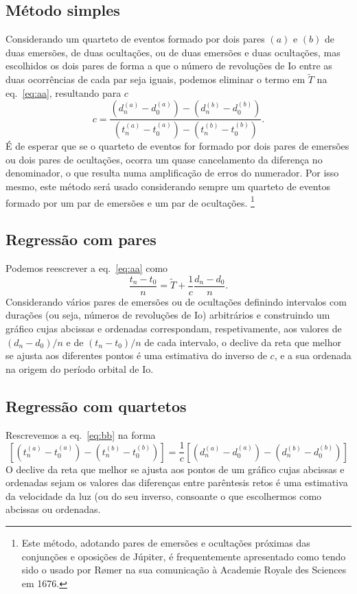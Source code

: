 \documentclass[]{article}
\begin{document}
\subsection{Método simples}
Considerando um quarteto de eventos formado por dois pares $(a)$ e $(b)$ de duas
emersões, de duas oculta\-ções, ou de duas emersões e duas ocultações, mas
escolhidos os dois pares de forma a que o número de revoluções de Io entre as
duas ocorrências de cada par seja iguais, podemos eliminar o termo em $\tilde T$
na eq.~\eqref{eq:aa}, resultando para $c$
\begin{equation}\label{eq:bb}
  c=\frac%
  {\left(d^{(a)}_n-d^{(a)}_0\right)-\left(d^{(b)}_n-d^{(b)}_0\right)}%
  {\left(t^{(a)}_n-t^{(a)}_0\right)-\left(t^{(b)}_n-t^{(b)}_0\right)}.
\end{equation}
 É de esperar que se o quarteto de eventos for formado por dois pares
de emersões ou dois pares de ocultações, ocorra um quase cancelamento da
diferença no denominador, o que resulta numa amplificação de erros do numerador.
Por isso mesmo, este método será usado considerando sempre um quarteto de
eventos formado por um par de emersões e um par de ocultações.%
\footnote{Este método, adotando pares de emersões e ocultações próximas das
  conjunções e oposições de Júpiter, é frequentemente apresentado como tendo
  sido o usado por R{\o}mer na sua comunicação à Academie Royale des Sciences em
1676.}

\subsection{Regressão com pares}
Podemos reescrever a eq.~\eqref{eq:aa} como
\begin{equation}
  \frac{t_n-t_0}{n}=\tilde T+\frac{1}{c}\frac{d_n-d_0}{n}.
\end{equation}
Considerando vários pares de emersões ou de ocultações definindo intervalos com
durações (ou seja, números de revoluções de Io) arbitrários e construindo um
gráfico cujas abcissas e ordenadas correspondam, respetivamente, aos valores de
$(d_n-d_0)/n$ e de $(t_n-t_0)/n$ de cada intervalo, o declive da reta que
melhor se ajusta aos diferentes pontos é uma estimativa do inverso de $c$, e a
sua ordenada na origem do período orbital de Io.

\subsection{Regressão com quartetos}
Rescrevemos a eq.~\eqref{eq:bb} na forma
\begin{equation}
  \left[
    {\left(t^{(a)}_n-t^{(a)}_0\right)-\left(t^{(b)}_n-t^{(b)}_0\right)}
  \right]=
  \frac{1}{c}
  \left[
    {\left(d^{(a)}_n-d^{(a)}_0\right)-\left(d^{(b)}_n-d^{(b)}_0\right)}
  \right]
\end{equation}
O declive da reta que melhor se ajusta aos pontos de um gráfico cujas abcissas e
ordenadas sejam os valores das diferenças entre parêntesis retos é uma
estimativa da velocidade da luz (ou do seu inverso, consoante o que escolhermos
como abcissas ou ordenadas.
\end{document}
